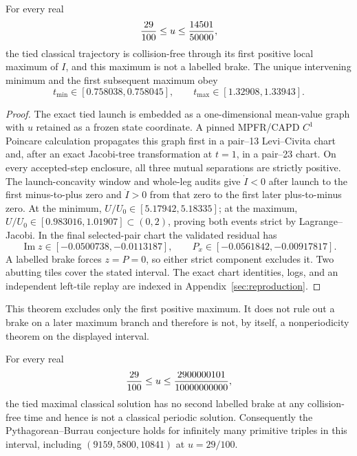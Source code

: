 \begin{theorem}
For every real
\[
 {29\over100}\le u\le {14501\over50000},
\]
the tied classical trajectory is collision-free through its first positive
local maximum of $I$, and this maximum is not a labelled brake.  The unique
intervening minimum and the first subsequent maximum obey
\[
 t_{\min}\in[0.758038,0.758045],\qquad
 t_{\max}\in[1.32908,1.33943].
\]
\end{theorem}
\begin{proof}
The exact tied launch is embedded as a one-dimensional mean-value graph with
$u$ retained as a frozen state coordinate.  A pinned MPFR/CAPD $C^1$
Poincare calculation propagates this graph first in a pair--13
Levi--Civita chart and, after an exact Jacobi-tree transformation at $t=1$,
in a pair--23 chart.  On every accepted-step enclosure, all three mutual
separations are strictly positive.  The launch-concavity window and whole-leg audits give $\dot I<0$ after
launch to the first minus-to-plus zero and $\dot I>0$ from that zero to the
first later plus-to-minus zero.  At the minimum,
$U/U_0\in[5.17942,5.18335]$; at the maximum,
$U/U_0\in[0.983016,1.01907]\subset(0,2)$, proving both events strict by
Lagrange--Jacobi.  In the final selected-pair chart the validated residual
has
\[
 \operatorname{Im}z\in[-0.0500738,-0.0113187],\qquad
 P_x\in[-0.0561842,-0.00917817].
\]
A labelled brake forces $z=P=0$, so either strict component excludes it.
Two abutting tiles cover the stated interval. The exact chart identities,
logs, and an independent left-tile replay are indexed in
Appendix~\ref{sec:reproduction}.
\end{proof}

This theorem excludes only the first positive maximum.  It does not rule out
a brake on a later maximum branch and therefore is not, by itself, a
nonperiodicity theorem on the displayed interval.

\begin{theorem}
For every real
\[
 {29\over100}\le u\le {2900000101\over10000000000},
\]
the tied maximal classical solution has no second labelled brake at any
collision-free time and hence is not a classical periodic solution.
Consequently the Pythagorean--Burrau conjecture holds for infinitely many
primitive triples in this interval, including
$(9159,5800,10841)$ at $u=29/100$.
\end{theorem}

